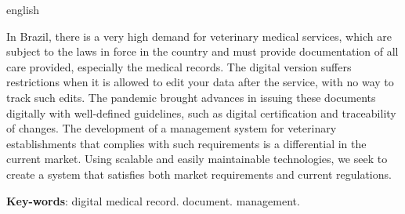 \documentclass[
    12pt,               %
    openright,          %
    oneside,
    a4paper,            %
    BIBLATEX,           %
    TODO,               %
    english,            %
    brazil              %
    ]{ifsp-spo-inf-ctds}
\begin{document}
\begin{resumo}[Abstract]
 \begin{otherlanguage*}{english}

 In Brazil, there is a very high demand for veterinary medical services, which are subject to the laws in force in the country and must provide documentation of all care provided, especially the medical records. The digital version suffers restrictions when it is allowed to edit your data after the service, with no way to track such edits. The pandemic brought advances in issuing these documents digitally with well-defined guidelines, such as digital certification and traceability of changes. The development of a management system for veterinary establishments that complies with such requirements is a differential in the current market. Using scalable and easily maintainable technologies, we seek to create a system that satisfies both market requirements and current regulations.

   \vspace{\onelineskip}

   \noindent 
   \textbf{Key-words}: digital medical record. document. management. 
 \end{otherlanguage*}
\end{resumo}


\listoffigures*
\cleardoublepage

\listoftables*
\cleardoublepage

\listofquadros*
\cleardoublepage





%




%
\tableofcontents*
\textual
\end{document}
